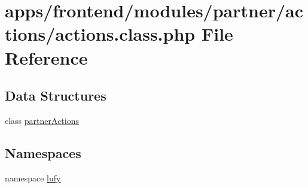 \hypertarget{frontend_2modules_2partner_2actions_2actions_8class_8php}{\section{apps/frontend/modules/partner/actions/actions.class.\-php File Reference}
\label{frontend_2modules_2partner_2actions_2actions_8class_8php}
}
\subsection*{Data Structures}
\begin{DoxyCompactItemize}
\item 
class \hyperlink{classpartner_actions}{partner\-Actions}
\end{DoxyCompactItemize}
\subsection*{Namespaces}
\begin{DoxyCompactItemize}
\item 
namespace \hyperlink{namespacelufy}{lufy}
\end{DoxyCompactItemize}
